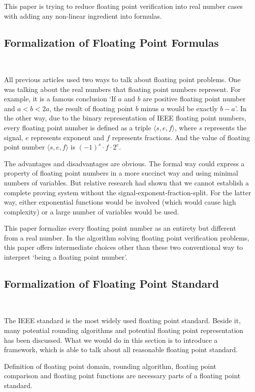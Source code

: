 \documentclass[12pt]{article}
\begin{document}
This paper is trying to reduce floating point verification into real number cases with adding any non-linear ingredient into formulas.

\subsection{Formalization of Floating Point Formulas}\

All previous articles used two ways to talk about floating point problems. One was talking about the real numbers that floating point numbers represent. For example, it is a famous conclusion `If $a$ and $b$ are positive floating point number and $a<b<2a$, the result of floating point $b$ minus $a$ would be exactly $b-a$'. In the other way, due to the binary representation of IEEE floating point numbers, every floating point number is defined as a triple $\langle s, e, f \rangle$, where $s$ represents the signal, $e$ represents exponent and $f$ represents fractions. And the value of floating point number $\langle s, e, f \rangle$ is $(-1)^s\cdot f\cdot 2^e$.

The advantages and disadvantages are obvious. The formal way could express a property of floating point numbers in a more succinct way and using minimal numbers of variables. But relative research had shown that we cannot establish a complete proving system without the signal-exponent-fraction-split. For the latter way, either exponential functions would be involved (which would cause high complexity) or a large number of variables would be used.

This paper formalize every floating point number as an entirety but different from a real number. In the algorithm solving floating point verification problems, this paper offers intermediate choices other than these two conventional way to interpret `being a floating point number'.

\subsection{Formalization of Floating Point Standard} \

The IEEE standard is the most widely used floating point standard. Beside it, many potential rounding algorithms and potential floating point representation has been discussed. What we would do in this section is to introduce a framework, which is able to talk about all reasonable floating point standard.

Definition of floating point domain, rounding algorithm, floating point comparison and floating point functions are necessary parts of a floating point standard.
\end{document}
